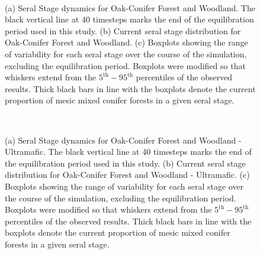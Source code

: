 \begin{figure}[!htbp]
  \centering
  \\
  \caption{(a) Seral Stage dynamics for Oak-Conifer Forest and Woodland. The black vertical line at 40 timesteps marks the end of the equilibration period used in this study. (b) Current seral stage distribution for Oak-Conifer Forest and Woodland. (c) Boxplots showing the range of variability for each seral stage over the course of the simulation, excluding the equilibration period. Boxplots were modified so that whiskers extend from the $5^{\text{th}} - 95^{\text{th}}$ percentiles of the observed results. Thick black bars in line with the boxplots denote the current proportion of mesic mixed conifer forests in a given seral stage.} 
  \label{fig:covcond_ocfw}
\end{figure}

\begin{figure}[!htbp]
  \centering
  \\
  \caption{(a) Seral Stage dynamics for Oak-Conifer Forest and Woodland - Ultramafic. The black vertical line at 40 timesteps marks the end of the equilibration period used in this study. (b) Current seral stage distribution for Oak-Conifer Forest and Woodland - Ultramafic. (c) Boxplots showing the range of variability for each seral stage over the course of the simulation, excluding the equilibration period. Boxplots were modified so that whiskers extend from the $5^{\text{th}} - 95^{\text{th}}$ percentiles of the observed results. Thick black bars in line with the boxplots denote the current proportion of mesic mixed conifer forests in a given seral stage.} 
  \label{fig:covcond_ocfwu}
\end{figure}

